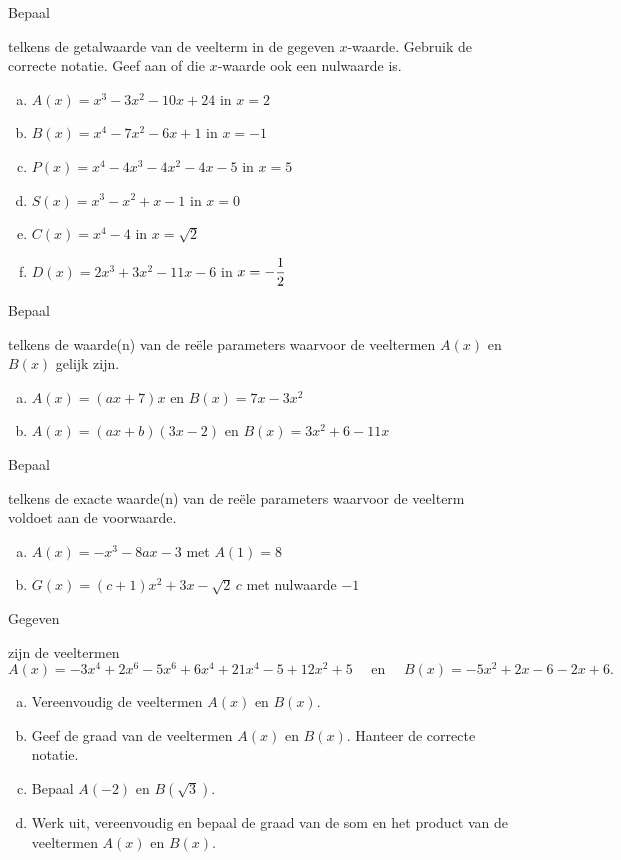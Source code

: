 \documentclass{ximera}
\begin{document}
\begin{Oefening}\setcounter{enumi}{8}
\hypertarget{oef1.8}{Bepaal} telkens de getalwaarde van de veelterm in de gegeven $x$-waarde. Gebruik de correcte notatie. Geef aan of die $x$-waarde ook een nulwaarde is. 
\begin{enumerate}[(a)]
\item
$A(x) = x^3-3x^2-10x+24$ \quad in $x = 2$
\item
$B(x) = x^4-7x^2-6x+1$ \quad in $x = -1$
\item
$P(x) = x^4-4x^3-4x^2-4x-5$ \quad in $x = 5$
\item
$S(x) = x^3-x^2+x-1$ \quad in $x = 0$
\item
$C(x) = x^4-4$ \quad in $x = \sqrt{2}$
\item
$D(x) = 2x^3 + 3x^2 - 11x - 6$ \quad in $\displaystyle x = -\frac{1}{2}$
\end{enumerate}
\end{Oefening}

\begin{Oefening}\setcounter{enumi}{9} 
\hypertarget{oef1.9}{Bepaal} telkens de waarde(n) van de re\"ele parameters waarvoor de veeltermen $A(x)$ en $B(x)$ gelijk zijn.
\begin{enumerate}[(a)]
\item
$A(x) = (ax+7)x$ en $B(x) = 7x-3x^2$ %
\item
$A(x) = (ax+b)(3x-2)$ en $B(x) = 3x^2+6-11x$ %
\end{enumerate}
\end{Oefening}

\begin{Oefening}\setcounter{enumi}{10} 
\hypertarget{oef1.10}{Bepaal} telkens de exacte waarde(n) van de re\"ele parameters waarvoor de veelterm voldoet aan de voorwaarde. 
\begin{enumerate}[(a)]
\item
$A(x) = -x^3-8ax-3$  %
met $A(1) = 8$ 
\item
$G(x) = (c+1)x^2+3x-\sqrt{2}\,c$ %
met nulwaarde $-1$
\end{enumerate}
\end{Oefening}

\begin{Oefening}\setcounter{enumi}{11} 
\hypertarget{oef1.11}{Gegeven} zijn de veeltermen 
\[
A(x) = -3x^4+2x^6-5x^6+6x^4+21x^4-5+12x^2+5 \quad \text{ en } \quad B(x) = -5x^2+2x-6-2x+6.
\]
\begin{enumerate}[(a)]
\item
Vereenvoudig de veeltermen $A(x)$ en $B(x)$.
\item
Geef de graad van de veeltermen $A(x)$ en $B(x)$. Hanteer de correcte notatie.
\item
Bepaal $A(-2)$ en $B(\sqrt{3})$. 
\item
Werk uit, vereenvoudig en bepaal de graad van de som en het product van de veeltermen $A(x)$ en $B(x)$. 
\end{enumerate}
\end{Oefening}
\end{document}

